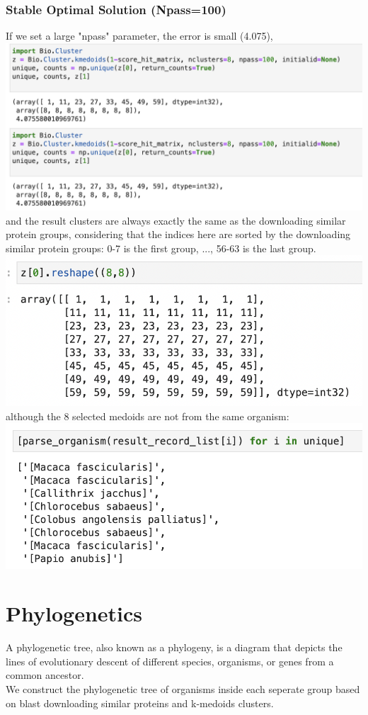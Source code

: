 \documentclass[a4paper, 12pt, one column]{article}
\begin{document}
\subsubsection*{Stable Optimal Solution (Npass=100)}
If we set a large "npass" parameter, the error is small (4.075), \\
\includegraphics [width=.8\linewidth] {clustering_result_npass100.png} \\
and the result clusters are always exactly the same as the downloading similar protein groups, considering that the indices here are sorted by the downloading similar protein groups: 0-7 is the first group, ..., 56-63 is the last group.\\
\includegraphics [width=.8\linewidth] {clusters.png} \\
although the 8 selected medoids are not from the same organism:\\
\includegraphics [width=.8\linewidth] {medoids.png} \\

\section{Phylogenetics}
A phylogenetic tree, also known as a phylogeny, is a diagram that depicts the lines of evolutionary descent of different species, organisms, or genes from a common ancestor.\\
We construct the phylogenetic tree of organisms inside each seperate group based on blast downloading similar proteins and k-medoids clusters.
\end{document}
